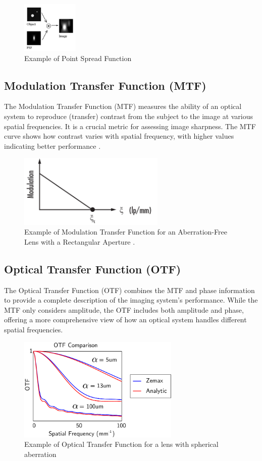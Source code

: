 \begin{figure}[h]
\centering
\includegraphics[width=2.7cm]{Images/psf.png}
\caption{Example of Point Spread Function \cite{PSF}}
\label{fig:psf}
\end{figure}

\subsection{Modulation Transfer Function (MTF)}
The Modulation Transfer Function (MTF) measures the ability of an optical system to reproduce (transfer) contrast from the subject to the image at various spatial frequencies. It is a crucial metric for assessing image sharpness. The MTF curve shows how contrast varies with spatial frequency, with higher values indicating better performance \cite{MTF}.

\begin{figure}[h]
\centering
\includegraphics[height=3.5cm]{Images/MTF_example.png}
\caption{Example of Modulation Transfer Function for an Aberration-Free Lens with a Rectangular Aperture \cite{MTFimage}.}
\label{fig:mtf}
\end{figure}

\subsection{Optical Transfer Function (OTF)}
The Optical Transfer Function (OTF) combines the MTF and phase information to provide a complete description of the imaging system's performance. While the MTF only considers amplitude, the OTF includes both amplitude and phase, offering a more comprehensive view of how an optical system handles different spatial frequencies.

\begin{figure}[h]
\centering
\includegraphics[height=5cm]{Images/OTF_example.png}
\caption{Example of Optical Transfer Function for a lens with spherical aberration \cite{OTFimage}}
\label{fig:otf}
\end{figure}

